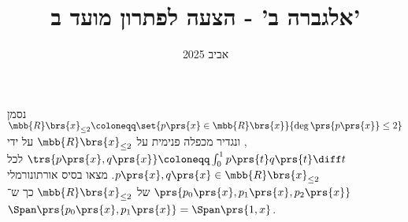 \documentclass[a4paper,10pt,twoside,openany]{article}
\title{
אלגברה ב' - הצעה לפתרון מועד ב'
}
\date{אביב 2025}
\begin{document}
\maketitle

\setcounter{question}{4}

\begin{question}
נסמן
$\mbb{R}\brs{x}_{\leq 2} \coloneqq \set{p\prs{x} \in \mbb{R}\brs{x}}{\deg\prs{p\prs{x}} \leq 2}$,
ונגדיר מכפלה פנימית על
$\mbb{R}\brs{x}_{\leq 2}$
על ידי
$\trs{p\prs{x}, q\prs{x}} \coloneqq \int_0^1 p\prs{t} q\prs{t} \diff t$
לכל
$p\prs{x}, q\prs{x} \in \mbb{R}\brs{x}_{\leq 2}$.
מצאו בסיס אורתונורמלי
$\prs{p_0\prs{x}, p_1\prs{x}, p_2\prs{x}}$
של
$\mbb{R}\brs{x}_{\leq 2}$
כך ש־%
$\Span\prs{p_0\prs{x}, p_1\prs{x}} = \Span\prs{1,x}$.
\end{question}
\end{document}
